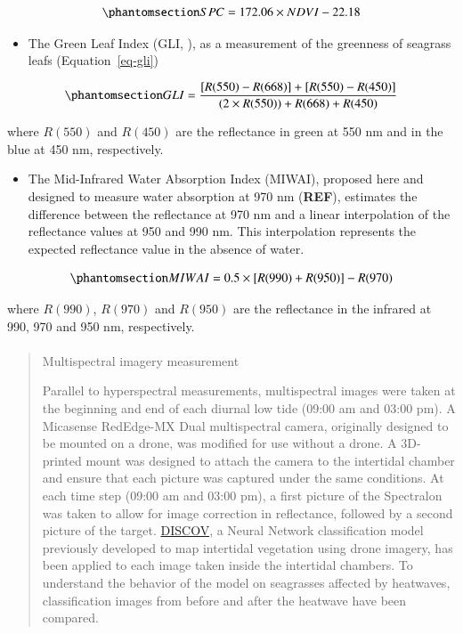 \documentclass[
  number]{elsarticle}
\makeatletter
\let\oldparagraph\paragraph
\renewcommand{\paragraph}{
    \@ifstar
      \xxxParagraphStar
      \xxxParagraphNoStar
  }
\newcommand{\xxxParagraphStar}[1]{\oldparagraph*{#1}\mbox{}}
\newcommand{\xxxParagraphNoStar}[1]{\oldparagraph{#1}\mbox{}}
\providecommand{\tightlist}{%
  \setlength{\itemsep}{0pt}\setlength{\parskip}{0pt}}\usepackage{longtable,booktabs,array}
\makeatother
\begin{document}
\begin{equation}\phantomsection\label{eq-spc}{
SPC = 172.06 \times NDVI - 22.18
}\end{equation}

\begin{itemize}
\tightlist
\item
  The Green Leaf Index (GLI, \citep{louhaichi2001spatially}), as a
  measurement of the greenness of seagrass leafs (Equation~\ref{eq-gli})
\end{itemize}

\begin{equation}\phantomsection\label{eq-gli}{
GLI = \frac{[R(550)-R(668)]+[R(550)-R(450)]}{(2 \times R(550) )+ R(668) + R(450) }
}\end{equation}

where \(R(550)\) and \(R(450)\) are the reflectance in green at 550 nm
and in the blue at 450 nm, respectively.

\begin{itemize}
\tightlist
\item
  The Mid-Infrared Water Absorption Index (MIWAI), proposed here and
  designed to measure water absorption at 970 nm (\textbf{REF}),
  estimates the difference between the reflectance at 970 nm and a
  linear interpolation of the reflectance values at 950 and 990 nm. This
  interpolation represents the expected reflectance value in the absence
  of water.
\end{itemize}

\begin{equation}\phantomsection\label{eq-MIWAI}{
MIWAI = 0.5 \times [R(990)+R(950)]-R(970)
}\end{equation}

where \(R(990)\), \(R(970)\) and \(R(950)\) are the reflectance in the
infrared at 990, 970 and 950 nm, respectively.

\begin{quote}
\mbox{}%
\paragraph{Multispectral imagery
measurement}\label{multispectral-imagery-measurement}

Parallel to hyperspectral measurements, multispectral images were taken
at the beginning and end of each diurnal low tide (09:00 am and 03:00
pm). A Micasense RedEdge-MX Dual multispectral camera, originally
designed to be mounted on a drone, was modified for use without a drone.
A 3D-printed mount was designed to attach the camera to the intertidal
chamber and ensure that each picture was captured under the same
conditions. At each time step (09:00 am and 03:00 pm), a first picture
of the Spectralon was taken to allow for image correction in
reflectance, followed by a second picture of the target.
\href{https://sigoiry.github.io/DISCOV-MicaSense/}{DISCOV}, a Neural
Network classification model previously developed to map intertidal
vegetation using drone imagery, has been applied to each image taken
inside the intertidal chambers. To understand the behavior of the model
on seagrasses affected by heatwaves, classification images from before
and after the heatwave have been compared.
\end{quote}
\end{document}
